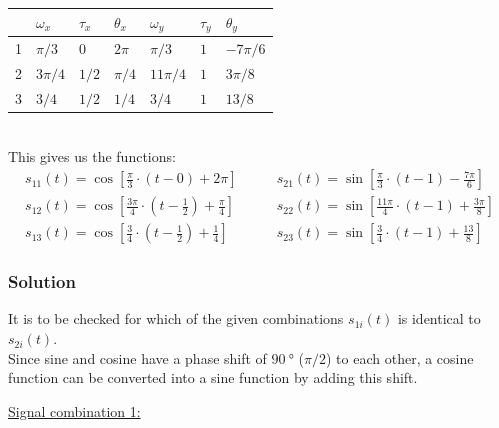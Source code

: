\begin{enumerate}
		\begin{nscenter}
			\begin{tabular}{c|lll|lll}
				& $\omega_x$ & $\tau_x$ & $\theta_x$ & $\omega_y$ & $\tau_y$ & $\theta_y$ \\
				\hline
				1 & $\pi/{3}$ & $0$ & $2\pi$ & $\pi/3$ & $1$ & $-7\pi/6$ \\
				2 & $3\pi/4$ & $1/2$ & $\pi/4$ & $11\pi/4$ & $1$ & $3\pi/8$ \\
				3 & $3/4$ & $1/2$ & $1/4$ & $3/4$ & $1$ & $13/8$ \\
			\end{tabular}
		\end{nscenter}\\
		This gives us the functions:
		{
			\setlength{\abovedisplayskip}{0pt}
			\setlength{\belowdisplayskip}{6pt}
			\setlength{\abovedisplayshortskip}{0pt}
			\setlength{\belowdisplayshortskip}{0pt}
			\begin{align*}
				s_{11}(t) = \cos\left[\frac{\pi}{3}\cdot\left(t-0\right)+2\pi\right] & \qquad 
				s_{21}(t) = \sin\left[\frac{\pi}{3}\cdot\left(t-1\right)-\frac{7\pi}{6}\right] \\
				s_{12}(t) = \cos\left[\frac{3\pi}{4}\cdot\left(t-\frac{1}{2}\right)+\frac{\pi}{4}\right] & \qquad 
				s_{22}(t) = \sin\left[\frac{11\pi}{4}\cdot\left(t-1\right)+\frac{3\pi}{8}\right] \\
				s_{13}(t) = \cos\left[\frac{3}{4}\cdot\left(t-\frac{1}{2}\right)+\frac{1}{4}\right] & \qquad 
				s_{23}(t) = \sin\left[\frac{3}{4}\cdot\left(t-1\right)+\frac{13}{8}\right]
			\end{align*}
		}
		\subsubsection{Solution}
		It is to be checked for which of the given combinations $s_{1i}(t)$ is identical to $s_{2i}(t)$. \\
		Since sine and cosine have a phase shift of $\SI{90}{\degree}$ ($\pi/2$) to each other, a cosine function can be converted into a sine function by adding this shift. \vspace{2pt}
		{
			\setlength{\abovedisplayskip}{0pt}
			\setlength{\belowdisplayskip}{6pt}
			\setlength{\abovedisplayshortskip}{0pt}
			\setlength{\belowdisplayshortskip}{0pt}
			
			\underline{Signal combination 1:}
			
}
\end{enumerate}
